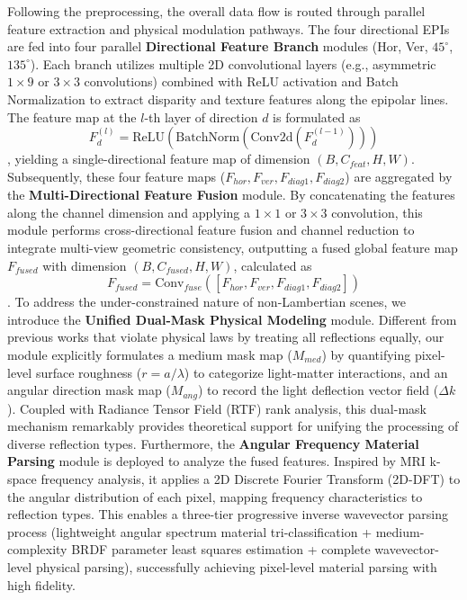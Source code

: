 \documentclass[journal]{IEEEtran}
\begin{document}
Following the preprocessing, the overall data flow is routed through parallel feature extraction and physical modulation pathways. The four directional EPIs are fed into four parallel \textbf{Directional Feature Branch} modules (Hor, Ver, $45^\circ$, $135^\circ$). Each branch utilizes multiple 2D convolutional layers (e.g., asymmetric $1 \times 9$ or $3 \times 3$ convolutions) combined with ReLU activation and Batch Normalization to extract disparity and texture features along the epipolar lines. The feature map at the $l$-th layer of direction $d$ is formulated as \[
F_d^{(l)} = \text{ReLU}(\text{BatchNorm}(\text{Conv2d}(F_d^{(l-1)})))
\], yielding a single-directional feature map of dimension $(B, C_{feat}, H, W)$. Subsequently, these four feature maps ($F_{hor}, F_{ver}, F_{diag1}, F_{diag2}$) are aggregated by the \textbf{Multi-Directional Feature Fusion} module. By concatenating the features along the channel dimension and applying a $1 \times 1$ or $3 \times 3$ convolution, this module performs cross-directional feature fusion and channel reduction to integrate multi-view geometric consistency, outputting a fused global feature map $F_{fused}$ with dimension $(B, C_{fused}, H, W)$, calculated as \[
F_{fused} = \text{Conv}_{fuse}([F_{hor}, F_{ver}, F_{diag1}, F_{diag2}])
\]. To address the under-constrained nature of non-Lambertian scenes, we introduce the \textbf{Unified Dual-Mask Physical Modeling} module. Different from previous works that violate physical laws by treating all reflections equally, our module explicitly formulates a medium mask map ($M_{med}$) by quantifying pixel-level surface roughness ($r = a/\lambda$) to categorize light-matter interactions, and an angular direction mask map ($M_{ang}$) to record the light deflection vector field ($\Delta k$). Coupled with Radiance Tensor Field (RTF) rank analysis, this dual-mask mechanism remarkably provides theoretical support for unifying the processing of diverse reflection types. Furthermore, the \textbf{Angular Frequency Material Parsing} module is deployed to analyze the fused features. Inspired by MRI k-space frequency analysis, it applies a 2D Discrete Fourier Transform (2D-DFT) to the angular distribution of each pixel, mapping frequency characteristics to reflection types. This enables a three-tier progressive inverse wavevector parsing process (lightweight angular spectrum material tri-classification + medium-complexity BRDF parameter least squares estimation + complete wavevector-level physical parsing), successfully achieving pixel-level material parsing with high fidelity.
\end{document}
